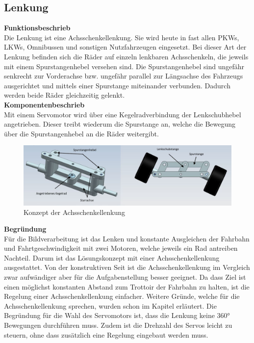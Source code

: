\subsection{Lenkung}

\textbf{Funktionsbeschrieb}
\\[0.2cm]
Die Lenkung ist eine Achsschenkellenkung. Sie wird heute in fast allen PKWs, LKWs, Omnibussen und sonstigen Nutzfahrzeugen eingesetzt. Bei dieser Art der Lenkung befinden sich die Räder auf einzeln lenkbaren Achsschenkeln, die jeweils mit einem Spurstangenhebel versehen sind. Die Spurstangenhebel sind ungefähr senkrecht zur Vorderachse bzw. ungefähr parallel zur Längsachse des Fahrzeugs ausgerichtet und mittels einer Spurstange miteinander verbunden. Dadurch werden beide Räder gleichzeitig gelenkt.\\[0.2cm]
\textbf{Komponentenbeschrieb}
\\[0.2cm]
Mit einem Servomotor wird über eine Kegelradverbindung der Lenkschubhebel angetrieben. Dieser treibt wiederum die Spurstange an, welche die Bewegung über die Spurstangenhebel an die Räder weitergibt.
\begin{figure}[H]%
\centering
\includegraphics[width=1\textwidth]{03_Loesungskonzept/pictures/Achsschenkellenkung.png}
\caption{Konzept der Achsschenkellenkung}
\label{fig:activityRoute}
\end{figure}\flushleft
\textbf{Begründung}\\[0.2cm]
Für die Bildverarbeitung ist das Lenken und konstante Ausgleichen der Fahrbahn und Fahrtgeschwindigkeit mit zwei Motoren, welche jeweils ein Rad antreiben Nachteil. Darum ist das Lösungskonzept mit einer Achsschenkellenkung ausgestattet. Von der konstruktiven Seit ist die Achsschenkellenkung im Vergleich zwar aufwändiger aber für die Aufgabenstellung besser geeignet. Da dass Ziel ist einen möglichst konstanten Abstand zum Trottoir der Fahrbahn zu halten, ist die Regelung einer Achsschenkellenkung einfacher. Weitere Gründe, welche für die Achsschenkellenkung sprechen, wurden schon im Kapitel \grqq  erläutert.
Die Begründung für die Wahl des Servomotors ist, dass die Lenkung keine 360° Bewegungen durchführen muss. Zudem ist die Drehzahl des Servos leicht zu steuern, ohne dass zusätzlich eine Regelung eingebaut werden muss. \\[0.2cm]
